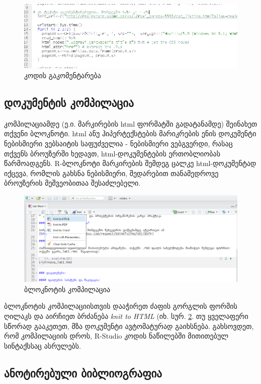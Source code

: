 \documentclass{article}\usepackage[]{graphicx}\usepackage[]{color}
\begin{document}
\begin{figure}[h]
\centering
\includegraphics[width=\textwidth]{img/commented.PNG}
\caption{კოდის გაკომენტარება}
    \label{comment}
\end{figure}



\subsection*{დოკუმენტის კომპილაცია}

კომპილაციამდე (ე.ი. მარკირების html ფორმატში გადატანამდე) შეინახეთ თქვენი ბლოკნოტი. html ანუ ჰიპერტექსტების მარიკრების ენის დოკუმენტი ნებისმიერი ვებსაიტის საფუძველია - ნებისმიერი ვებგვერდი, რასაც თქვენს ბროუზერში ხედავთ, html-დოკუმენტების ერთობლიობას წარმოადგენს. R-ბლოკნოტი მარკირების შემდეგ ცალკე html-დოკუმენტად იქცევა, რომლის გახსნა ნებისმიერი, შედარებით თანამედროვე ბროუზერის მეშვეობითაა შესაძლებელი.

\begin{figure}[h]
\centering
\includegraphics[width=\textwidth]{img/knit_to_html.PNG}
\caption{ბლოკნოტის კომპილაცია}
    \label{compile}
\end{figure}


ბლოკნოტის კომპილაციისთვის დააჭირეთ ძაფის გორგლის ფორმის ღილაკს და აირჩიეთ ბრძანება \emph{knit to HTML} (იხ. სურ. \ref{compile}. თუ ყველაფერი სწორად გააკეთეთ, მზა დოკუმენტი ავტომატურად გაიხსნება. გახსოვდეთ, რომ კომპილაციის დროს, R-Studio კოდის ნაწილებში მითითებულ სინტაქსსაც ასრულებს.

\subsection*{ანოტირებული ბიბლიოგრაფია}
\end{document}
